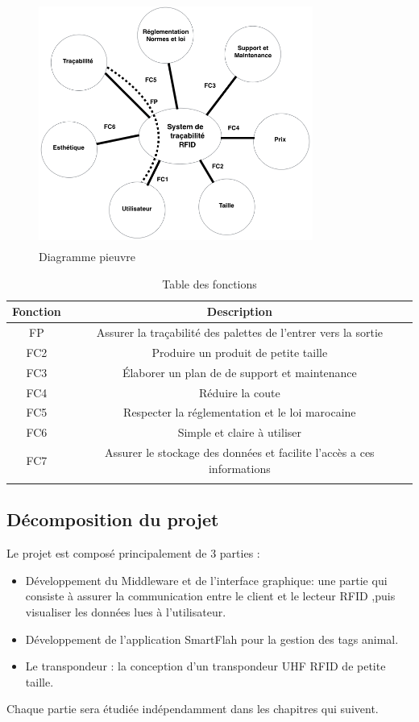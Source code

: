 \documentclass[11pt, a4paper, twoside]{book}
\begin{document}
\begin{figure}[H]
\centering
\includegraphics[width=9cm,height=8cm]{pieuvre}
\caption{Diagramme pieuvre}
\end{figure}


\begin{longtable}{|c|c|}
\hline
\textbf{Fonction} & \textbf{Description} \\
\hline
FP & Assurer la traçabilité des palettes de l'entrer vers la sortie  \\
\hline
FC2 & Produire un produit de petite taille  \\
\hline
FC3 & Élaborer un plan de de support et maintenance  \\
\hline
FC4 & Réduire la coute   \\
\hline
FC5 & Respecter la réglementation et le loi marocaine \\
\hline
FC6 & Simple et claire à utiliser \\
\hline
FC7 & Assurer le stockage des données et facilite l'accès a ces informations \\
\hline
\caption{Table des fonctions}
\end{longtable}



\subsection{Décomposition du projet}
Le projet est composé principalement de 3 parties :
\begin{itemize}
\item Développement du Middleware et de l'interface graphique: une partie qui consiste à assurer la communication entre le client et le lecteur RFID ,puis visualiser les données lues à l'utilisateur.
\item Développement de l'application SmartFlah pour la gestion des tags animal.
\item Le transpondeur : la conception d'un transpondeur UHF RFID de petite taille.\\
\end{itemize}
Chaque partie sera étudiée indépendamment dans les chapitres qui suivent.
\end{document}
